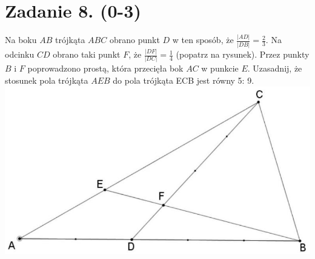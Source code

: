 \documentclass[10pt]{article}
\begin{document}
\section*{Zadanie 8. (0-3)}
Na boku \(A B\) trójkąta \(A B C\) obrano punkt \(D\) w ten sposób, że \(\frac{|A D|}{|D B|}=\frac{2}{3}\). Na odcinku \(C D\) obrano taki punkt \(F\), że \(\frac{|D F|}{|D C|}=\frac{1}{4}\) (popatrz na rysunek). Przez punkty \(B\) i \(F\) poprowadzono prostą, która przecięła bok \(A C\) w punkcie \(E\). Uzasadnij, że stosunek pola trójkąta \(A E B\) do pola trójkąta ECB jest równy 5: 9.\\
\includegraphics[max width=\textwidth, center]{2024_11_21_49bfa1d51da2e7fce9c5g-06}
\end{document}
